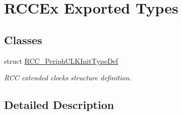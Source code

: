 \hypertarget{group___r_c_c_ex___exported___types}{\section{R\-C\-C\-Ex Exported Types}
\label{group___r_c_c_ex___exported___types}
}
\subsection*{Classes}
\begin{DoxyCompactItemize}
\item 
struct \hyperlink{struct_r_c_c___periph_c_l_k_init_type_def}{R\-C\-C\-\_\-\-Periph\-C\-L\-K\-Init\-Type\-Def}
\begin{DoxyCompactList}\small\item\em R\-C\-C extended clocks structure definition. \end{DoxyCompactList}\end{DoxyCompactItemize}


\subsection{Detailed Description}
